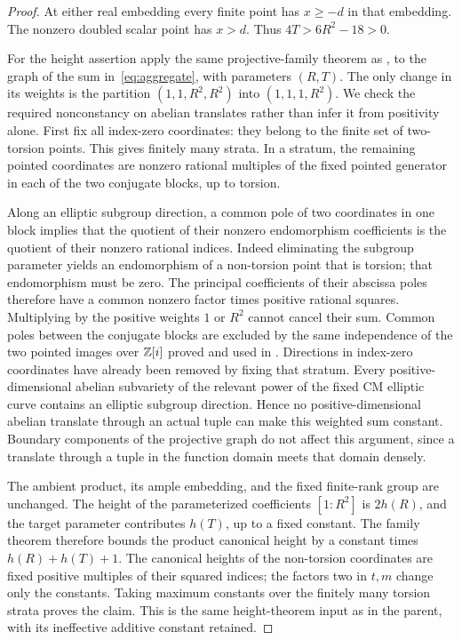 \documentclass[11pt,a4paper]{article}
\begin{document}
\begin{proof}
At either real embedding every finite point has $x\ge-d$ in that
embedding. The nonzero doubled scalar point has $x>d$. Thus
$4T>6R^2-18>0$.

For the height assertion apply the same projective-family theorem as
\cite{Weighted}, to the graph of the sum in~\eqref{eq:aggregate}, with
parameters $(R,T)$. The only change in its weights is the partition
$(1,1,R^2,R^2)$ into $(1,1,1,R^2)$. We check the required
nonconstancy on abelian translates rather than infer it from positivity
alone. First fix all index-zero coordinates: they belong to the finite
set of two-torsion points. This gives finitely many strata. In a stratum,
the remaining pointed coordinates are nonzero rational multiples of the
fixed pointed generator in each of the two conjugate blocks, up to torsion.

Along an elliptic subgroup direction, a common pole of two coordinates
in one block implies that the quotient of their nonzero endomorphism
coefficients is the quotient of their nonzero rational indices. Indeed
eliminating the subgroup parameter yields an endomorphism of a non-torsion
point that is torsion; that endomorphism must be zero. The principal
coefficients of their abscissa poles therefore have a common nonzero
factor times positive rational squares. Multiplying by the positive
weights $1$ or $R^2$ cannot cancel their sum. Common poles between the
conjugate blocks are excluded by the same independence of the two pointed
images over $\mathbb Z[i]$ proved and used in \cite{Weighted}. Directions in
index-zero coordinates have already been removed by fixing that stratum.
Every positive-dimensional abelian subvariety of the relevant power of the fixed CM elliptic curve contains an elliptic subgroup direction. Hence no positive-dimensional abelian translate through an actual tuple
can make this weighted sum constant. Boundary components of the projective
graph do not affect this argument, since a translate through a tuple in
the function domain meets that domain densely.

The ambient product, its ample embedding, and the fixed finite-rank group
are unchanged. The height of the parameterized coefficients $[1:R^2]$
is $2h(R)$, and the target parameter contributes $h(T)$, up to a fixed
constant. The family theorem therefore bounds the product canonical
height by a constant times $h(R)+h(T)+1$. The canonical heights of the
non-torsion coordinates are fixed positive multiples of their squared
indices; the factors two in $t,m$ change only the constants. Taking
maximum constants over the finitely many torsion strata proves the claim.
This is the same height-theorem input as in the parent, with its ineffective
additive constant retained.
\end{proof}
\end{document}

